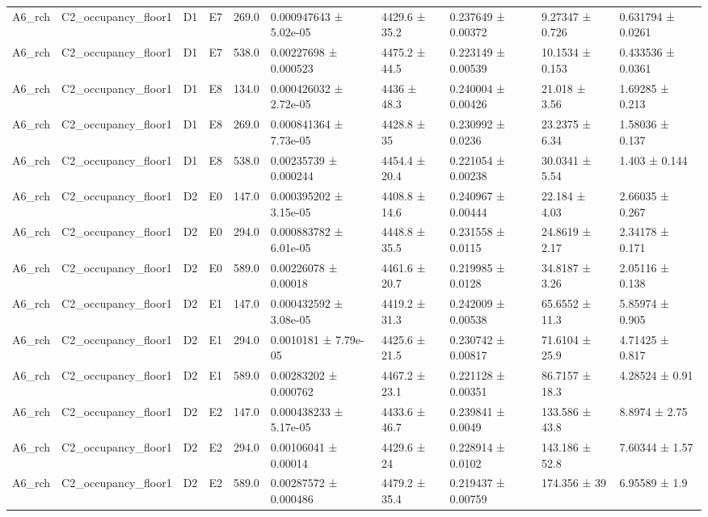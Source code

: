 \begin{table}
\begin{tabular}{llllllllll}
A6\_rch & C2\_occupancy\_floor1 & D1 & E7 & 269.0 & 0.000947643 ± 5.02e-05 & 4429.6 ± 35.2 & 0.237649 ± 0.00372 & 9.27347 ± 0.726 & 0.631794 ± 0.0261 \\
A6\_rch & C2\_occupancy\_floor1 & D1 & E7 & 538.0 & 0.00227698 ± 0.000523 & 4475.2 ± 44.5 & 0.223149 ± 0.00539 & 10.1534 ± 0.153 & 0.433536 ± 0.0361 \\
A6\_rch & C2\_occupancy\_floor1 & D1 & E8 & 134.0 & 0.000426032 ± 2.72e-05 & 4436 ± 48.3 & 0.240004 ± 0.00426 & 21.018 ± 3.56 & 1.69285 ± 0.213 \\
A6\_rch & C2\_occupancy\_floor1 & D1 & E8 & 269.0 & 0.000841364 ± 7.73e-05 & 4428.8 ± 35 & 0.230992 ± 0.0236 & 23.2375 ± 6.34 & 1.58036 ± 0.137 \\
A6\_rch & C2\_occupancy\_floor1 & D1 & E8 & 538.0 & 0.00235739 ± 0.000244 & 4454.4 ± 20.4 & 0.221054 ± 0.00238 & 30.0341 ± 5.54 & 1.403 ± 0.144 \\
A6\_rch & C2\_occupancy\_floor1 & D2 & E0 & 147.0 & 0.000395202 ± 3.15e-05 & 4408.8 ± 14.6 & 0.240967 ± 0.00444 & 22.184 ± 4.03 & 2.66035 ± 0.267 \\
A6\_rch & C2\_occupancy\_floor1 & D2 & E0 & 294.0 & 0.000883782 ± 6.01e-05 & 4448.8 ± 35.5 & 0.231558 ± 0.0115 & 24.8619 ± 2.17 & 2.34178 ± 0.171 \\
A6\_rch & C2\_occupancy\_floor1 & D2 & E0 & 589.0 & 0.00226078 ± 0.00018 & 4461.6 ± 20.7 & 0.219985 ± 0.0128 & 34.8187 ± 3.26 & 2.05116 ± 0.138 \\
A6\_rch & C2\_occupancy\_floor1 & D2 & E1 & 147.0 & 0.000432592 ± 3.08e-05 & 4419.2 ± 31.3 & 0.242009 ± 0.00538 & 65.6552 ± 11.3 & 5.85974 ± 0.905 \\
A6\_rch & C2\_occupancy\_floor1 & D2 & E1 & 294.0 & 0.0010181 ± 7.79e-05 & 4425.6 ± 21.5 & 0.230742 ± 0.00817 & 71.6104 ± 25.9 & 4.71425 ± 0.817 \\
A6\_rch & C2\_occupancy\_floor1 & D2 & E1 & 589.0 & 0.00283202 ± 0.000762 & 4467.2 ± 23.1 & 0.221128 ± 0.00351 & 86.7157 ± 18.3 & 4.28524 ± 0.91 \\
A6\_rch & C2\_occupancy\_floor1 & D2 & E2 & 147.0 & 0.000438233 ± 5.17e-05 & 4433.6 ± 46.7 & 0.239841 ± 0.0049 & 133.586 ± 43.8 & 8.8974 ± 2.75 \\
A6\_rch & C2\_occupancy\_floor1 & D2 & E2 & 294.0 & 0.00106041 ± 0.00014 & 4429.6 ± 24 & 0.228914 ± 0.0102 & 143.186 ± 52.8 & 7.60344 ± 1.57 \\
A6\_rch & C2\_occupancy\_floor1 & D2 & E2 & 589.0 & 0.00287572 ± 0.000486 & 4479.2 ± 35.4 & 0.219437 ± 0.00759 & 174.356 ± 39 & 6.95589 ± 1.9 \\

\end{tabular}
\end{table}
